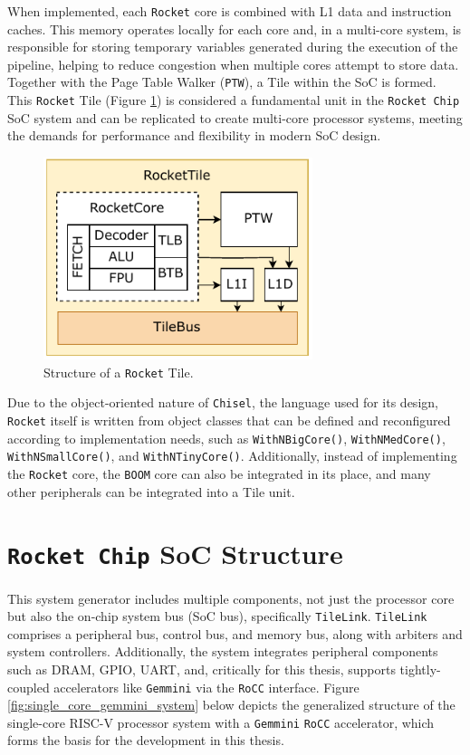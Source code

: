 When implemented, each \texttt{Rocket} core is combined with L1 data and instruction caches. This memory operates locally for each core and, in a multi-core system, is responsible for storing temporary variables generated during the execution of the pipeline, helping to reduce congestion when multiple cores attempt to store data. Together with the Page Table Walker (\texttt{PTW}), a Tile within the SoC is formed. This \texttt{Rocket} Tile (Figure \ref{fig:rocket_tile_structure}) is considered a fundamental unit in the \texttt{Rocket Chip} SoC system and can be replicated to create multi-core processor systems, meeting the demands for performance and flexibility in modern SoC design.

\begin{figure}[h!]
    \centering
    \includegraphics[width=0.7\textwidth]{Images/RocketTile_Basic.pdf}
    \caption{Structure of a \texttt{Rocket} Tile.}
    \label{fig:rocket_tile_structure}
\end{figure}

Due to the object-oriented nature of \texttt{Chisel}, the language used for its design, \texttt{Rocket} itself is written from object classes that can be defined and reconfigured according to implementation needs, such as \texttt{WithNBigCore()}, \texttt{WithNMedCore()}, \texttt{WithNSmallCore()}, and \texttt{WithNTinyCore()}. Additionally, instead of implementing the \texttt{Rocket} core, the \texttt{BOOM} core can also be integrated in its place, and many other peripherals can be integrated into a Tile unit.


\section{\texttt{Rocket Chip} SoC Structure}
\label{sec:rocketchip_soc_structure}

This system generator includes multiple components, not just the processor core but also the on-chip system bus (SoC bus), specifically \texttt{TileLink}. \texttt{TileLink} comprises a peripheral bus, control bus, and memory bus, along with arbiters and system controllers. Additionally, the system integrates peripheral components such as DRAM, GPIO, UART, and, critically for this thesis, supports tightly-coupled accelerators like \texttt{Gemmini} via the \texttt{RoCC} interface. Figure \ref{fig:single_core_gemmini_system} below depicts the generalized structure of the single-core RISC-V processor system with a \texttt{Gemmini} \texttt{RoCC} accelerator, which forms the basis for the development in this thesis.

